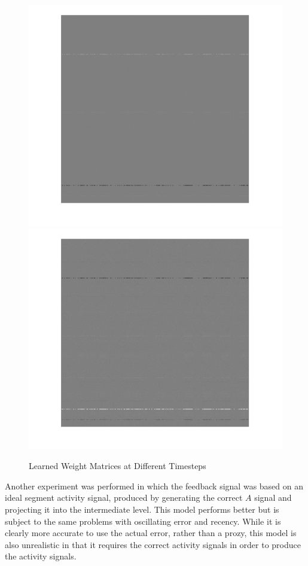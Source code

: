 \documentclass[12pt]{article}
\begin{document}
    \begin{figure}[h!]
      \centering
      \includegraphics[scale=0.25]{fig2.png}
      \includegraphics[scale=0.25]{fig3.png}
      \caption{Learned Weight Matrices at Different Timesteps}
    \end{figure}

Another experiment was performed in which the feedback signal was based on an ideal segment activity signal, produced by generating the correct \(A\) signal and projecting it into the intermediate level. This model performs better but is subject to the same problems with oscillating error and recency. While it is clearly more accurate to use the actual error, rather than a prozy, this model is also unrealistic in that it requires the correct activity signals in order to produce the activity signals.
\end{document}
